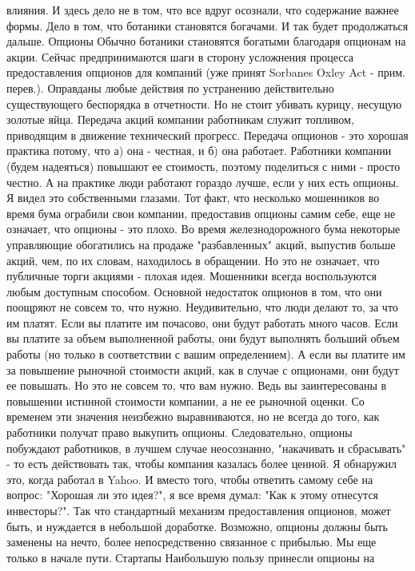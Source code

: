 \documentclass[ebook,12pt,oneside,openany]{memoir}
\begin{document}
влияния. И здесь дело не в том, что все вдруг осознали, что содержание
важнее формы. Дело в том, что ботаники становятся богачами. И так
будет продолжаться дальше. Опционы Обычно ботаники становятся богатыми
благодаря опционам на акции. Сейчас предпринимаются шаги в сторону
усложнения процесса предоставления опционов для компаний (уже принят
Sorbanes Oxley Act - прим. перев.). Оправданы любые действия по
устранению действительно существующего беспорядка в отчетности. Но не
стоит убивать курицу, несущую золотые яйца. Передача акций компании
работникам служит топливом, приводящим в движение технический
прогресс. Передача опционов - это хорошая практика потому, что а) она
- честная, и б) она работает. Работники компании (будем надеяться)
повышают ее стоимость, поэтому поделиться с ними - просто честно. А на
практике люди работают гораздо лучше, если у них есть опционы. Я видел
это собственными глазами. Тот факт, что несколько мошенников во время
бума ограбили свои компании, предоставив опционы самим себе, еще не
означает, что опционы - это плохо. Во время железнодорожного бума
некоторые управляющие обогатились на продаже "разбавленных" акций,
выпустив больше акций, чем, по их словам, находилось в обращении. Но
это не означает, что публичные торги акциями - плохая идея. Мошенники
всегда воспользуются любым доступным способом. Основной недостаток
опционов в том, что они поощряют не совсем то, что нужно.
Неудивительно, что люди делают то, за что им платят. Если вы платите
им почасово, они будут работать много часов. Если вы платите за объем
выполненной работы, они будут выполнять больший объем работы (но
только в соответствии с вашим определением). А если вы платите им за
повышение рыночной стоимости акций, как в случае с опционами, они
будут ее повышать. Но это не совсем то, что вам нужно. Ведь вы
заинтересованы в повышении истинной стоимости компании, а не ее
рыночной оценки. Со временем эти значения неизбежно выравниваются, но
не всегда до того, как работники получат право выкупить опционы.
Следовательно, опционы побуждают работников, в лучшем случае
неосознанно, "накачивать и сбрасывать" - то есть действовать так,
чтобы компания казалась более ценной. Я обнаружил это, когда работал в
Yahoo. И вместо того, чтобы ответить самому себе на вопрос: "Хорошая
ли это идея?", я все время думал: "Как к этому отнесутся инвесторы?".
Так что стандартный механизм предоставления опционов, может быть, и
нуждается в небольшой доработке. Возможно, опционы должны быть
заменены на нечто, более непосредственно связанное с прибылью. Мы еще
только в начале пути. Стартапы Наибольшую пользу принесли опционы на
\end{document}
